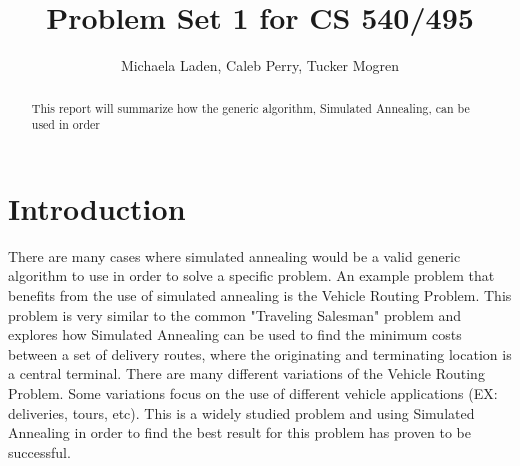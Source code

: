 \documentclass[11pt]{article}
\newcommand{\<}{\langle}
\renewcommand{\>}{\rangle}
\theoremstyle{definition}
\begin{document}
\title{Problem Set 1 for CS 540/495}
 \author{Michaela Laden, Caleb Perry, Tucker Mogren}				
\maketitle
\begin{abstract}  %
This report will summarize how the generic algorithm, Simulated Annealing, can be used in order 
\end{abstract}

\section{Introduction} 
There are many cases where simulated annealing would be a valid generic algorithm to use in order to solve a specific problem. An example problem that benefits from the use of simulated annealing is the Vehicle Routing Problem. This problem is very similar to the common "Traveling Salesman" problem and explores how Simulated Annealing can be used to find the minimum costs between a set of delivery routes, where the originating and terminating location is a central terminal. There are many different variations of the Vehicle Routing Problem. Some variations focus on the use of different vehicle applications (EX: deliveries, tours, etc). This is a widely studied problem and using Simulated Annealing in order to find the best result for this problem has proven to be successful. 

%


\end{document}
